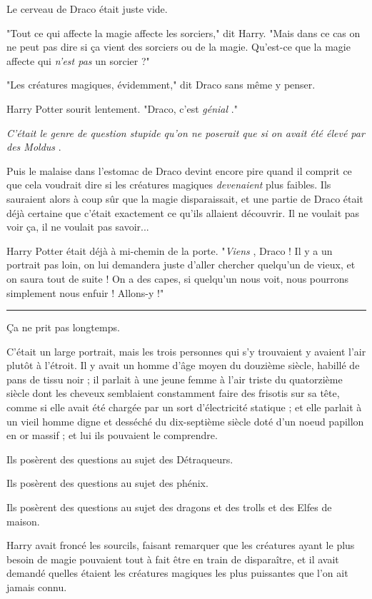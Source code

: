 Le cerveau de Draco était juste vide.

"Tout ce qui affecte la magie affecte les sorciers," dit Harry. "Mais dans ce cas on ne peut pas dire si ça vient des sorciers ou de la magie. Qu'est-ce que la magie affecte qui \emph{n'est pas}  un sorcier ?"

"Les créatures magiques, évidemment," dit Draco sans même y penser.

Harry Potter sourit lentement. "Draco, c'est \emph{génial} ."

\emph{C'était le genre de question stupide qu'on ne poserait que si on avait été élevé par des Moldus} .

Puis le malaise dans l'estomac de Draco devint encore pire quand il comprit ce que cela voudrait dire si les créatures magiques \emph{devenaient}  plus faibles. Ils sauraient alors à coup sûr que la magie disparaissait, et une partie de Draco était déjà certaine que c'était exactement ce qu'ils allaient découvrir. Il ne voulait pas voir ça, il ne voulait pas savoir...

Harry Potter était déjà à mi-chemin de la porte. "\emph{Viens} , Draco ! Il y a un portrait pas loin, on lui demandera juste d'aller chercher quelqu'un de vieux, et on saura tout de suite ! On a des capes, si quelqu'un nous voit, nous pourrons simplement nous enfuir ! Allons-y !"
\par\noindent\rule{\textwidth}{0.4pt}
Ça ne prit pas longtemps.

C'était un large portrait, mais les trois personnes qui s'y trouvaient y avaient l'air plutôt à l'étroit. Il y avait un homme d'âge moyen du douzième siècle, habillé de pans de tissu noir ; il parlait à une jeune femme à l'air triste du quatorzième siècle dont les cheveux semblaient constamment faire des frisotis sur sa tête, comme si elle avait été chargée par un sort d'électricité statique ; et elle parlait à un vieil homme digne et desséché du dix-septième siècle doté d'un noeud papillon en or massif ; et lui ils pouvaient le comprendre.

Ils posèrent des questions au sujet des Détraqueurs.

Ils posèrent des questions au sujet des phénix.

Ils posèrent des questions au sujet des dragons et des trolls et des Elfes de maison.

Harry avait froncé les sourcils, faisant remarquer que les créatures ayant le plus besoin de magie pouvaient tout à fait être en train de disparaître, et il avait demandé quelles étaient les créatures magiques les plus puissantes que l'on ait jamais connu.

